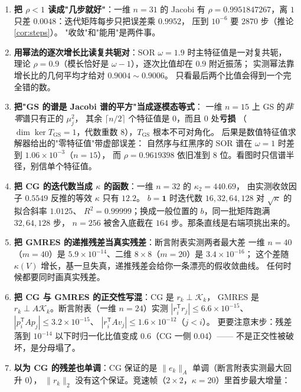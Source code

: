 \begin{enumerate}
  \item \textbf{把 $\rho<1$ 读成"几步就好"}：一维 $n=31$ 的 Jacobi 有
        $\rho=0.9951847267$，离 $1$ 只差 $0.0048$：迭代矩阵每步只把误差乘 $0.9952$，
        压到 $10^{-6}$ 要 $2870$ 步（推论 \ref{cor:steps}）。
        "收敛"和"能用"是两件事。
  \item \textbf{用幂法的逐次增长比读复共轭对}：SOR $\omega=1.9$ 时主特征值是一对复共轭，
        理论 $\rho=0.9$（模长恰好是 $\omega-1$），逐次比值却在 $0.9$ 附近振荡；
        实测幂法靠增长比的几何平均才给对 $0.9004\sim0.9006$。
        只看最后两个比值会得到一个完全错的数。
  \item \textbf{把"GS 的谱是 Jacobi 谱的平方"当成逐模态等式}：
        一维 $n=15$ 上 GS 的\emph{非零}谱只有正的 $\mu_j^2$，
        其余 $\lceil n/2\rceil$ 个特征值是 $0$，而且 $0$ 处\textbf{亏损}
        （$\dim\ker T_{\mathrm{GS}}=1$，代数重数 $8$），$T_{\mathrm{GS}}$ 根本不可对角化。
        后果是数值特征值求解器给出的"零特征值"带虚部误差：
        自然序与红黑序的 SOR 谱在 $\omega=1$ 时差到 $1.06\times10^{-3}$（$n=15$），
        而 $\rho=0.9619398$ 依旧准到 $8$ 位。看图时只信谱半径，别信单个特征值。
  \item \textbf{把 CG 的迭代数当成 $\kappa$ 的函数}：一维 $n=32$ 的 $\kappa_2=440.69$，
        由实测收敛因子 $0.5549$ 反推的等效 $\kappa$ 只有 $12.2$。
        $b=\mathbf 1$ 时迭代数 $16,32,64,128$ 对 $\sqrt\kappa$ 的拟合斜率 $1.0125$、
        $R^2=0.99999$；换成一般位置的 $b$，同一批矩阵跑满 $32,64,128$ 步，
        $n=256$ 被舍入底截在 $164$ 步。那条直线是右端项挑出来的。
  \item \textbf{把 GMRES 的递推残差当真实残差}：断言附表实测两者最大差
        一维 $n=40$（$m=40$）是 $5.9\times10^{-14}$、二维 $8\times8$（$m=20$）是 $3.4\times10^{-16}$；
        这个差随 $\kappa(V)$ 增长，基一旦失真，递推残差会给你一条漂亮的假收敛曲线。
        任何时候都要同时画真实残差。
  \item \textbf{把 CG 与 GMRES 的正交性写混}：CG 是 $r_k\perp\mathcal K_k$，
        GMRES 是 $r_k\perp A\mathcal K_k$。断言附表（一维 $n=24$）实测
        $|r_i^{\mathsf T}r_j|\le6.6\times10^{-15}$、$|p_i^{\mathsf T}Ap_j|\le3.2\times10^{-15}$、
        $|r_i^{\mathsf T}Av_j|\le1.6\times10^{-12}$（$j<i$）。
        更要注意末步：残差落到 $10^{-14}$ 以下时归一化比值变成 $0.6$（CG 一侧 $0.04$）——
        不是正交性被破坏，是分母塌了。
  \item \textbf{以为 CG 的残差也单调}：CG 保证的是 $\|e_k\|_A$ 单调（断言附表实测最大回升 $0$），
        $\|r_k\|_2$ 没有这个保证。竞速帧（$2\times2$，$\kappa=20$）里首步最大增量：

\end{enumerate}
